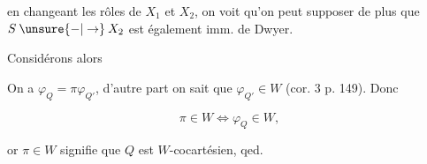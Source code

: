 
en changeant les rôles de $X_1$ et $X_2$, on voit qu'on peut supposer de plus que $S\mathbin{\unsure{-|\to}}X_2$ est également imm.  de Dwyer.

Considérons alors


On a $\varphi_Q=\pi\varphi_{Q'}$, d'autre part on sait que $\varphi_{Q'}\in W$ (cor. 3 p. 149). Donc

\[
\pi\in W\Longleftrightarrow\varphi_Q\in W,
\]

or $\pi\in W$ signifie que $Q$ est $W$-cocartésien, qed.
